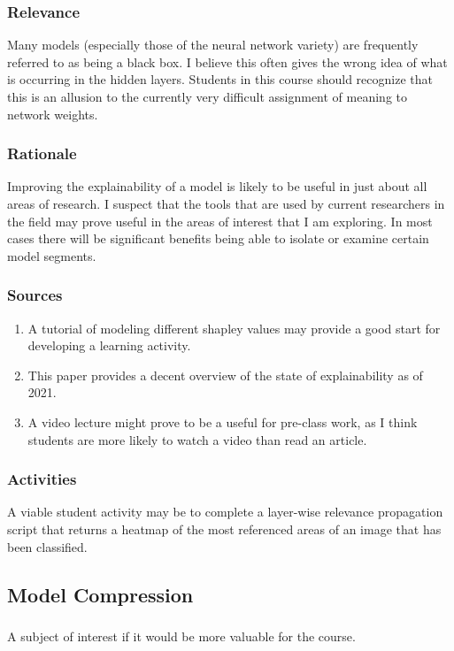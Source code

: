\documentclass[12pt]{amsart}
\begin{document}
\subsubsection{Relevance}
Many models (especially those of the neural network variety) are frequently referred to as being a black box. 
I believe this often gives the wrong idea of what is occurring in the hidden layers.
Students in this course should recognize that this is an allusion to the currently very difficult 
assignment of meaning to network weights.

\subsubsection{Rationale}
Improving the explainability of a model is likely to be useful in just about all areas of research.
I suspect that the tools that are used by current researchers in the field may prove useful
in the areas of interest that I am exploring. In most cases there will be significant benefits 
being able to isolate or examine certain model segments.

\subsubsection{Sources}
\begin{enumerate}
	\item A tutorial \cite{shap_intro} of modeling different shapley values may provide a good start
	for developing a learning activity.
	\item This paper \cite{Gohel_Singh_Mohanty_2021} provides a decent overview of the state of explainability as of 2021.
	\item A video lecture \cite{LRP_2021} might prove to be a useful
	for pre-class work, as I think students are more likely to watch a video than read an article.	
\end{enumerate}

\subsubsection{Activities}
A viable student activity may be to complete a layer-wise relevance propagation script that returns a heatmap
of the most referenced areas of an image that has been classified.


\subsection{Model Compression}
\subsubsection{}
A subject of interest if it would be more valuable for the course.

\vfill

\nocite{*}


\end{document}

